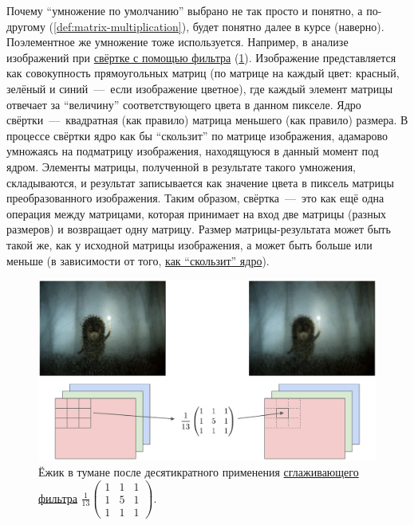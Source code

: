 \documentclass[a4paper,12pt]{article}
\begin{document}
  Почему ``умножение по умолчанию'' выбрано не так просто и понятно, а по-другому (\ref{def:matrix-multiplication}), будет понятно далее в курсе (наверно).
  Поэлементное же умножение тоже используется.
  Например, в анализе изображений при \href{https://en.wikipedia.org/wiki/Kernel\_(image\_processing)}{свёртке с помощью фильтра} (\ref{fig:ezh-in-conv}).
  Изображение представляется как совокупность прямоугольных матриц (по матрице на каждый цвет: красный, зелёный и синий~---~если изображение цветное), где каждый элемент матрицы отвечает за ``величину'' соответствующего цвета в данном пикселе.
  Ядро свёртки~---~квадратная (как правило) матрица меньшего (как правило) размера.
  В процессе свёртки ядро как бы ``скользит'' по матрице изображения, адамарово умножаясь на подматрицу изображения, находящуюся в данный момент под ядром.
  Элементы матрицы, полученной в результате такого умножения, складываются, и результат записывается как значение цвета в пиксель матрицы преобразованного изображения.
  Таким образом, свёртка~---~это как ещё одна операция между матрицами, которая принимает на вход две матрицы (разных размеров) и возвращает одну матрицу.
  Размер матрицы-результата может быть такой же, как у исходной матрицы изображения, а может быть больше или меньше (в зависимости от того, \href{https://github.com/vdumoulin/conv\_arithmetic}{как ``скользит'' ядро}).
  
  \begin{figure}[h]
    \centering
    
    \includegraphics[width=0.8\columnwidth]{EzhStripped.png}
    
    \caption{Ёжик в тумане после десятикратного применения \href{https://github.com/python-pillow/Pillow/blob/e4b39d9cc74f26dad1f5cad0851645cc2cd5356d/src/PIL/ImageFilter.py\#L305}{сглаживающего фильтра} $\frac{1}{13} \left(\begin{smallmatrix} 1 & 1 & 1 \\ 1 & 5 & 1 \\ 1 & 1 & 1 \end{smallmatrix}\right)$.}
    \label{fig:ezh-in-conv}
  \end{figure}
  
\end{document}
